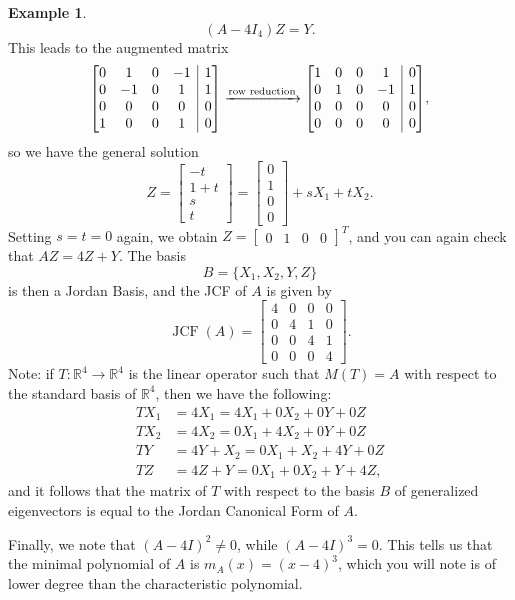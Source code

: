 \documentclass[12pt,letterpaper]{article}
\makeatletter
\theoremstyle{definition}
\newtheorem{example}{Example}
\newenvironment{amatrix}[1]{%
  \left[\begin{array}{@{}*{#1}{c}|c@{}}
}{%
  \end{array}\right]
}
\newcommand{\R}{\mathbb{R}}
\DeclareMathOperator{\jcf}{JCF}
\makeatother
\begin{document}
\begin{example}
\[
 (A-4I_4)Z=Y.
\]
This leads to the augmented matrix
\[
 \begin{amatrix}{4}
  0&1&0&-1&1\\0&-1&0&1&1\\0&0&0&0&0\\1&0&0&1&0
 \end{amatrix}\xrightarrow[]{\text{row reduction}}
 \begin{amatrix}{4}
  1&0&0&1&0\\0&1&0&-1&1\\0&0&0&0&0\\0&0&0&0&0
 \end{amatrix},
\]
so we have the general solution
\[
 Z = \begin{bmatrix}-t\\1+t\\s\\t\end{bmatrix} = \begin{bmatrix}0\\1\\0\\0\end{bmatrix}+sX_1+tX_2.
\]
Setting $s=t=0$ again, we obtain $Z=\begin{bmatrix}0&1&0&0\end{bmatrix}^T$, and you can again check that $AZ = 4Z+Y$. The basis
\[
 B=\{X_1,X_2,Y,Z\}
\]
is then a Jordan Basis, and the JCF of $A$ is given by
\[
 \jcf(A) = \begin{bmatrix}4&0&0&0\\0&4&1&0\\0&0&4&1\\0&0&0&4\end{bmatrix}.
\]
Note: if $T:\R^4\to \R^4$ is the linear operator such that $M(T)=A$ with respect to the standard basis of $\R^4$, then we have the following:
\begin{align*}
 TX_1 & = 4X_1 = 4X_1+0X_2+0Y+0Z\\
 TX_2 & = 4X_2 = 0X_1+4X_2+0Y+0Z\\
 TY & = 4Y+X_2 = 0X_1+X_2+4Y+0Z\\
 TZ & = 4Z+Y = 0X_1+0X_2+Y+4Z,
\end{align*}
and it follows that the matrix of $T$ with respect to the basis $B$ of generalized eigenvectors is equal to the Jordan Canonical Form of $A$.

Finally, we note that $(A-4I)^2\neq 0$, while $(A-4I)^3=0$. This tells us that the minimal polynomial of $A$ is $m_A(x)=(x-4)^3$, which you will note is of lower degree than the characteristic polynomial.
\end{example}
\end{document}
